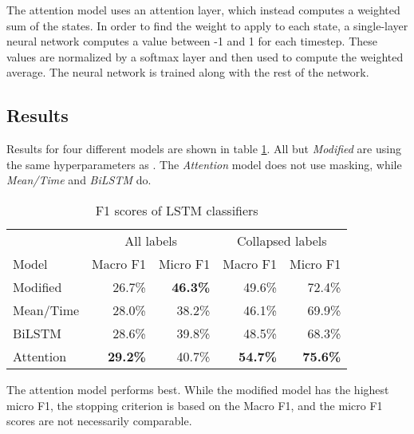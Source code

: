 The attention model uses an attention layer, which instead computes a
weighted sum of the states. In order to find the weight to apply to each
state, a single-layer neural network computes a value between -1 and 1 for
each timestep. These values are normalized by a softmax layer and then used
to compute the weighted average. The neural network is trained along with the
rest of the network.

\subsection{Results}

Results for four different models are shown in table \ref{lstm-results}. All
but \emph{Modified} are using the same hyperparameters as
\citeauthor{taghipour16}. The \emph{Attention} model does not use masking,
while \emph{Mean/Time} and \emph{BiLSTM} do.

\begin{table}
  \centering
  \begin{tabular}{|l|rr|rr|}
    \toprule
            & \multicolumn{2}{c|}{All labels} & \multicolumn{2}{c|}{Collapsed labels} \\
    Model     & Macro F1        & Micro F1        & Macro F1        & Micro F1        \\
    \midrule
    Modified  &         26.7\%  & \textbf{46.3\%} &         49.6\%  &         72.4\%  \\
    Mean/Time &         28.0\%  &         38.2\%  &         46.1\%  &         69.9\%  \\
    BiLSTM    &         28.6\%  &         39.8\%  &         48.5\%  &         68.3\%  \\
    Attention & \textbf{29.2\%} &         40.7\%  & \textbf{54.7\%} & \textbf{75.6\%} \\
    \bottomrule
  \end{tabular}
  \caption{F1 scores of LSTM classifiers}
  \label{lstm-results}
\end{table}

The attention model performs best. While the modified model has the highest
micro F1, the stopping criterion is based on the Macro F1, and the micro
F1 scores are not necessarily comparable.
